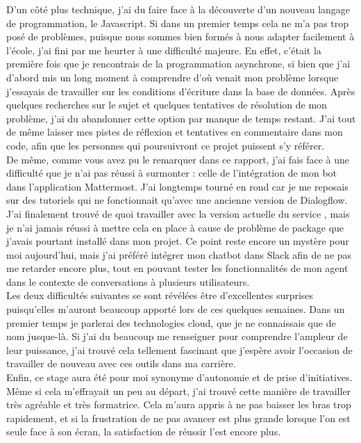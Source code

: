 \documentclass[stage2a]{tnreport} %
\begin{document}
D'un côté plus technique, j'ai du faire face à la découverte d'un nouveau langage de programmation, le Javascript. Si dans un premier temps cela ne m'a pas trop posé de problèmes, puisque nous sommes bien formés à nous adapter facilement à l'école, j'ai fini par me heurter à une difficulté majeure. En effet, c'était la première fois que je rencontrais de la programmation asynchrone, si bien que j'ai d'abord mis un long moment à comprendre d'où venait mon problème lorsque j'essayais de travailler sur les conditions d'écriture dans la base de données. Après quelques recherches sur le sujet et quelques tentatives de résolution de mon problème, j'ai du abandonner cette option par manque de temps restant. J'ai tout de même laisser mes pistes de réflexion et tentatives en commentaire dans mon code, afin que les personnes qui poursuivront ce projet puissent s'y référer. \\

De même, comme vous avez pu le remarquer dans ce rapport, j'ai fais face à une difficulté que je n'ai pas réussi à surmonter : celle de l'intégration de mon bot dans l'application Mattermost. J'ai longtemps tourné en rond car je me reposais sur des tutoriels qui ne fonctionnait qu'avec une ancienne version de Dialogflow. J'ai finalement trouvé de quoi travailler avec la version actuelle du service \cite{MMintegration}, mais je n'ai jamais réussi à mettre cela en place à cause de problème de package que j'avais pourtant installé dans mon projet. Ce point reste encore un mystère pour moi aujourd'hui, mais j'ai préféré intégrer mon chatbot dans Slack afin de ne pas me retarder encore plus, tout en pouvant tester les fonctionnalités de mon agent dans le contexte de conversations à plusieurs utilisateurs.\\

Les deux difficultés suivantes se sont révélées être d'excellentes surprises puisqu'elles m'auront beaucoup apporté lors de ces quelques semaines. Dans un premier temps je parlerai des technologies cloud, que je ne connaissais que de nom jusque-là. Si j'ai du beaucoup me renseigner pour comprendre l'ampleur de leur puissance, j'ai trouvé cela tellement fascinant que j'espère avoir l'occasion de travailler de nouveau avec ces outils dans ma carrière. \\

Enfin, ce stage aura été pour moi synonyme d'autonomie et de prise d'initiatives. Même si cela m'effrayait un peu au départ, j'ai trouvé cette manière de travailler très agréable et très formatrice. Cela m'aura appris à ne pas baisser les bras trop rapidement, et si la frustration de ne pas avancer est plus grande lorsque l'on est seule face à son écran, la satisfaction de réussir l'est encore plus. \\
\end{document}
